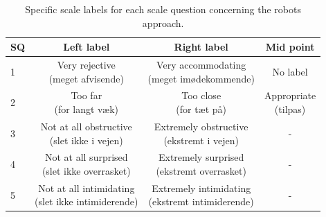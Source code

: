 %
\begin{table}[H]
	\centering
	\begin{tabular}{l|c|c|c}
		SQ     & Left label & Right label & Mid point \\\hline
		1   & \makecell{Very rejective \\(meget afvisende)} & \makecell{Very accommodating \\(meget imødekommende)} & No label          \\\hline
		2   & \makecell{Too far \\(for langt væk)} & \makecell{Too close \\(for tæt på)} & \makecell{Appropriate \\(tilpas)}         \\\hline
		3   & \makecell{Not at all obstructive \\(slet ikke i vejen)} & \makecell{Extremely obstructive \\(ekstremt i vejen)} & -         \\\hline
	 	4   & \makecell{Not at all surprised \\(slet ikke overrasket)} & \makecell{Extremely surprised \\(ekstremt overrasket)} & -         \\\hline
		5   & \makecell{Not at all intimidating \\(slet ikke intimiderende)} & \makecell{Extremely intimidating \\(ekstremt intimiderende)} & -           
	\end{tabular}
	\caption{Specific scale labels for each scale question concerning the robots approach.}
	\label{tab:ApproachScale}         
\end{table}
\noindent
%

